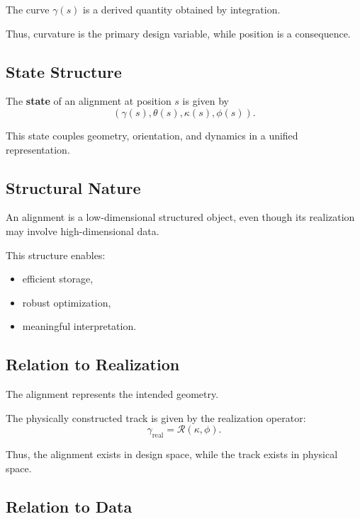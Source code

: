 The curve \(\gamma(s)\) is a derived quantity obtained by integration.

Thus, curvature is the primary design variable, while position is a
consequence.

\subsection{State Structure}

\begin{definition}
The \textbf{state} of an alignment at position \(s\) is given by
\[
(\gamma(s), \theta(s), \kappa(s), \phi(s)).
\]
\end{definition}

This state couples geometry, orientation, and dynamics in a unified
representation.

\subsection{Structural Nature}

\begin{proposition}
An alignment is a low-dimensional structured object, even though its
realization may involve high-dimensional data.
\end{proposition}

This structure enables:
\begin{itemize}
\item efficient storage,
\item robust optimization,
\item meaningful interpretation.
\end{itemize}

\subsection{Relation to Realization}

The alignment represents the intended geometry.

The physically constructed track is given by the realization operator:
\[
\gamma_{\mathrm{real}} = \mathcal{R}(\kappa, \phi).
\]

Thus, the alignment exists in design space, while the track exists in
physical space.

\subsection{Relation to Data}

